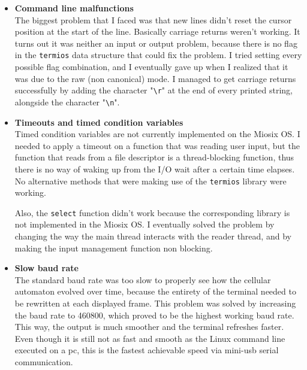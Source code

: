 \documentclass[10pt]{article}
\begin{document}
    \begin{itemize}
        \item \textbf{Command line malfunctions}\\
        The biggest problem that I faced was that new lines didn't reset the cursor position at the start of the line.
        Basically carriage returns weren't working.
        It turns out it was neither an input or output problem, because there is no flag in the \verb|termios| data structure that could fix the problem.
        I tried setting every possible flag combination, and I eventually gave up when I realized that it was due to the raw (non canonical) mode.
        I managed to get carriage returns successfully by adding the character "\verb|\r|" at the end of every printed string, alongside the character "\verb|\n|".

        \item \textbf{Timeouts and timed condition variables}\\
        Timed condition variables are not currently implemented on the Miosix OS.
        I needed to apply a timeout on a function that was reading user input, but the function that reads from a file descriptor is a thread-blocking function, thus there is no way of waking up from the I/O wait after a certain time elapses.
        No alternative methods that were making use of the \verb|termios| library were working.

        Also, the \verb|select| function didn't work because the corresponding library is not implemented in the Miosix OS.
        I eventually solved the problem by changing the way the main thread interacts with the reader thread, and by making the input management
        function non blocking.

        \item \textbf{Slow baud rate}\\
        The standard baud rate was too slow to properly see how the cellular automaton evolved over time, because the entirety of the terminal needed to be rewritten at each displayed frame.
        This problem was solved by increasing the baud rate to 460800, which proved to be the highest working baud rate. This way, the output is much smoother and the terminal refreshes faster.
        Even though it is still not as fast and smooth as the Linux command line executed on a pc, this is the fastest achievable speed via mini-usb serial communication.

    \end{itemize}
\end{document}
